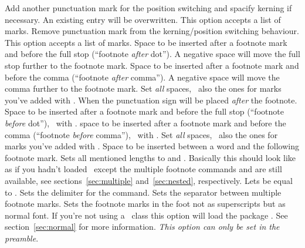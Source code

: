 \documentclass[load-preamble+]{cnltx-doc}
\begin{document}
\begin{options}
    Add another punctuation mark for the position switching and spacify
    kerning if necessary.  An existing entry will be overwritten.  This option
    accepts a list of marks.
    Remove punctuation mark from the kerning/position switching behaviour.
    This option accepts a list of marks.
  \Default{-.06em}
    Space to be inserted after a footnote mark and before the full stop
    (``footnote \emph{after} dot'').  A negative space will move the full stop
    further to the footnote mark.
  \Default{-.06em}
    Space to be inserted after a footnote mark and before the comma
    (``footnote \emph{after} comma'').  A negative space will move the comma
    further to the footnote mark.
    Set \emph{all} spaces, \ie\ also the ones for marks you've added with
    .
    When  the punctuation sign will be placed \emph{after} the
    footnote.
  \Default{-.16em}
    Space to be inserted after a footnote mark and before the full stop
    (``footnote \emph{before} dot''), \ie\ with .
  \Default{-.16em}
    space to be inserted after a footnote mark and before the comma
    (``footnote \emph{before} comma''), \ie\ with .
    Set \emph{all} spaces, \ie\ also the ones for marks you've added with
    .
  \Default{.06em}
    Space to be inserted between a word and the following footnote mark.
    Sets all mentioned lengths to \code{0pt} and .
    Basically this should look like as if you hadn't loaded \fnpct\ except the
    multiple footnote commands and  are still available, see
    sections~\ref{sec:multiple} and~\ref{sec:nested}, respectively.
    Lets  be equal to .
  \Default{;}
    Sets the delimiter for the  command.
  \Default{,}
    Sets the separator between multiple footnote marks.
  \label{opt:normal-marks}
    Sets the footnote marks in the foot not as superscripts but as normal
    font.  If you're not using a \KOMAScript\ class this option will load
    the package .  See section~\ref{sec:normal} for more
    information.  \emph{This option can only be set in the preamble}.
\end{options}
\end{document}
